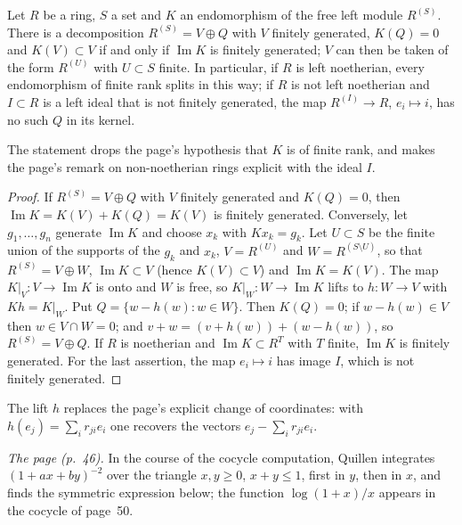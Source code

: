 \begin{encadre}
\begin{theoreme}\label{thm:quillen-1972-2}
Let $R$ be a ring, $S$ a set and $K$ an endomorphism of the free left module $R^{(S)}$. There is a decomposition $R^{(S)} = V \oplus Q$ with $V$ finitely generated, $K(Q) = 0$ and $K(V) \subset V$ if and only if $\operatorname{Im} K$ is finitely generated; $V$ can then be taken of the form $R^{(U)}$ with $U \subset S$ finite. In particular, if $R$ is left noetherian, every endomorphism of finite rank splits in this way; if $R$ is not left noetherian and $I \subset R$ is a left ideal that is not finitely generated, the map $R^{(I)} \to R$, $e_i \mapsto i$, has no such $Q$ in its kernel.
\end{theoreme}
\end{encadre}

\noindent The statement drops the page's hypothesis that $K$ is of finite rank, and makes the page's remark on non-noetherian rings explicit with the ideal $I$.

\begin{proof}
If $R^{(S)} = V \oplus Q$ with $V$ finitely generated and $K(Q) = 0$, then $\operatorname{Im} K = K(V) + K(Q) = K(V)$ is finitely generated. Conversely, let $g_1, \dots, g_n$ generate $\operatorname{Im} K$ and choose $x_k$ with $K x_k = g_k$. Let $U \subset S$ be the finite union of the supports of the $g_k$ and $x_k$, $V = R^{(U)}$ and $W = R^{(S \setminus U)}$, so that $R^{(S)} = V \oplus W$, $\operatorname{Im} K \subset V$ (hence $K(V) \subset V$) and $\operatorname{Im} K = K(V)$. The map $K|_V \colon V \to \operatorname{Im} K$ is onto and $W$ is free, so $K|_W \colon W \to \operatorname{Im} K$ lifts to $h \colon W \to V$ with $K h = K|_W$. Put $Q = \{w - h(w) : w \in W\}$. Then $K(Q) = 0$; if $w - h(w) \in V$ then $w \in V \cap W = 0$; and $v + w = (v + h(w)) + (w - h(w))$, so $R^{(S)} = V \oplus Q$. If $R$ is noetherian and $\operatorname{Im} K \subset R^T$ with $T$ finite, $\operatorname{Im} K$ is finitely generated. For the last assertion, the map $e_i \mapsto i$ has image $I$, which is not finitely generated.
\end{proof}

\noindent The lift $h$ replaces the page's explicit change of coordinates: with $h(e_j) = \sum_i r_{ji} e_i$ one recovers the vectors $e_j - \sum_i r_{ji} e_i$.

\emph{The page (p.~46).} In the course of the cocycle computation, Quillen integrates $(1 + ax + by)^{-2}$ over the triangle $x, y \ge 0$, $x + y \le 1$, first in $y$, then in $x$, and finds the symmetric expression below; the function $\log(1+x)/x$ appears in the cocycle of page~50.

